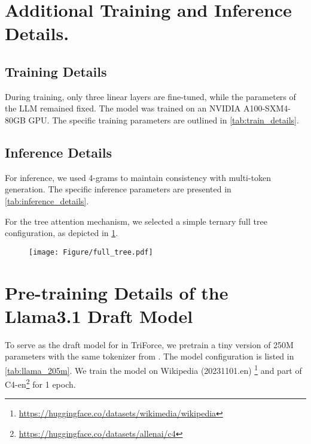 % 

\section{Additional Training and Inference Details.}
\label{app:train_infer_details}
\subsection{Training Details}
During training, only three linear layers are fine-tuned, while the parameters of the LLM remained fixed. The model was trained on an NVIDIA A100-SXM4-80GB GPU. The specific training parameters are outlined in \cref{tab:train_details}.


\subsection{Inference Details}
For inference, we used 4-grams to maintain consistency with multi-token generation. The specific inference parameters are presented in \cref{tab:inference_details}.


For the tree attention mechanism, we selected a simple ternary full tree configuration, as depicted in \cref{fig:tree-setting}.
\begin{figure}[htbp]
    \centering
    \label{fig:tree-setting}
    \texttt{[image: Figure/full\_tree.pdf]}
    
\end{figure}

\section{ Pre-training Details of the Llama3.1 Draft Model}
\label{app:llama3.1_draft}
To serve as the draft model for \llama in TriForce, we pretrain a tiny version of 250M parameters with the same tokenizer from \llama. The model configuration is listed in \cref{tab:llama_205m}. We train the model on Wikipedia (20231101.en) \footnote{\url{https://huggingface.co/datasets/wikimedia/wikipedia}} and part of C4-en\footnote{\url{https://huggingface.co/datasets/allenai/c4}} for 1 epoch. 

